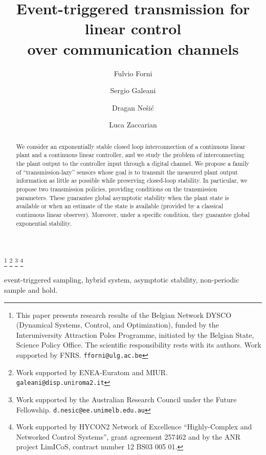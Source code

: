 \documentclass[twocolumn]{autart}
\begin{document}
\begin{frontmatter}
\title{{ Event-triggered transmission for linear control \\ over communication channels }}


\author[liegea]{Fulvio Forni}
\author[romaa]{Sergio Galeani}
\author[melba]{Dragan Ne\v{s}i\'{c}}
\author[laas,trento]{Luca Zaccarian}

\address[liegea]{Department of Electrical Engineering and Computer Science,
Universit\'e de Li{\`e}ge, 4000 Li{\`e}ge, Belgium.\\[-.6cm]}
\address[romaa]{DICII, University of Roma, Tor Vergata, 
Via del Politecnico 1, 
00133 Roma, Italy\\[-.6cm]}
\address[melba]{EEE Department, University of Melbourne, Australia.\\[-.6cm]}
\address[laas]{CNRS, LAAS, 7 avenue du colonel Roche, F-31400 Toulouse, France and
Univ. de Toulouse, LAAS, F-31400 Toulouse, France\\[-.6cm]}        
\address[trento]{Dipartimento di Ingegneria Industriale, University of
  Trento, Italy}        
\thanks[liege]{This paper presents research results of the Belgian Network DYSCO
(Dynamical Systems, Control, and Optimization), funded by the
Interuniversity Attraction Poles Programme, initiated by the Belgian
State, Science Policy Office. The scientific responsibility rests with
its authors. Work supported by FNRS. {\tt fforni@ulg.ac.be}}                  
\thanks[roma]{Work supported by ENEA-Euratom and MIUR. {\tt galeani@disp.uniroma2.it}}
\thanks[melb]{Work supported by the Australian Research Council under the Future Fellowship. {\tt d.nesic@ee.unimelb.edu.au}} 
\thanks[laas_trento]{Work supported by HYCON2 Network of Excellence ``Highly-Complex
and Networked Control Systems'', grant agreement 257462 and by the ANR project LimICoS, contract number 12 BS03 005 01.} 

\begin{abstract}
We consider an exponentially stable closed loop interconnection of a continuous linear plant 
and a continuous linear controller, and we study the problem of interconnecting the plant 
output to the controller input through a { digital channel.}
We propose a family of ``transmission-lazy'' sensors 
whose goal is to transmit the measured plant output information as little as possible 
while preserving closed-loop stability. In particular, we propose two transmission 
policies, providing conditions on the transmission parameters. 
These guarantee global asymptotic stability when the plant state is available or
when an estimate of the state is available (provided by a classical 
continuous linear observer). Moreover, under a specific condition, 
they guarantee global exponential stability. \vspace{-5mm}
\end{abstract}

\begin{keyword}
{ event-triggered sampling}, hybrid system, asymptotic stability, non-periodic sample and hold.
\end{keyword}
\end{frontmatter}
\end{document}
